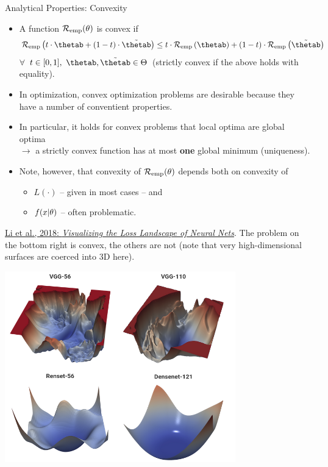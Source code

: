 \begin{vbframe}{Analytical Properties: Convexity}

\begin{itemize}
  \footnotesize
  \item A function $\mathcal{R}_{\text{emp}}(\theta)$ is convex if
  $$
  \riske\left(t \cdot \thetab + (1 - t) \cdot \tilde \thetab\right) \le t \cdot
  \riske\left(\thetab\right) + (1 - t) \cdot \riske\left(\tilde \thetab \right)
  $$
  $\forall$ $t \in [0, 1], ~\thetab, \tilde \thetab \in \Theta$
  (strictly convex if the above holds with equality).
  \item In optimization, convex optimization problems are desirable because 
  they have a number of conventient properties. 
  \item In particular, it holds for convex problems that local optima are 
  global optima \\$\rightarrow$ a strictly convex function has at most 
  \textbf{one} global minimum (uniqueness). 
  \item Note, however, that convexity of $\mathcal{R}_{\text{emp}}(\theta)$ depends both on convexity of 
  \begin{itemize} 
    \footnotesize
    \item $L(\cdot)$ -- given in most cases -- and 
    \item $f(x | \theta)$ -- often problematic.
  \end{itemize}  
\end{itemize} 

\vfill

\begin{minipage}[b]{0.5\textwidth}
  \footnotesize \raggedright
  \href{https://arxiv.org/pdf/1712.09913.pdf}{Li et al., 2018: 
  \textit{Visualizing the Loss Landscape of Neural Nets}}. 
  The problem on the bottom right is convex, the others are not (note that 
  very high-dimensional surfaces are coerced into 3D here).  
  \\
  \phantom{foo}
\end{minipage}%
\begin{minipage}[b]{0.05\textwidth}
  \phantom{foo}
\end{minipage}%
\begin{minipage}[b]{0.45\textwidth}
  \includegraphics[width=0.75\textwidth]{
  figure_man/convex-vs-nonconfex-landscape}
\end{minipage}%

\end{vbframe}

